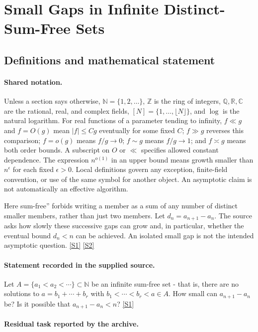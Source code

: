 \documentclass[11pt,a4paper]{article}
\newcommand{\N}{\mathbb{N}}
\newcommand{\Z}{\mathbb{Z}}
\newcommand{\Q}{\mathbb{Q}}
\newcommand{\R}{\mathbb{R}}
\newcommand{\C}{\mathbb{C}}
\newcommand{\sref}[2]{\hyperlink{source:#1:#2}{[S#2]}}
\begin{document}
\section{Small Gaps in Infinite Distinct-Sum-Free Sets}\label{statement}


\subsection{Definitions and mathematical statement}

\paragraph{Shared notation.}Unless a section says otherwise, $\N=\{1,2,\ldots\}$,
$\Z$ is the ring of integers, $\Q,\R,\C$ are the rational, real, and complex
fields, $[N]=\{1,\ldots,\lfloor N\rfloor\}$, and $\log$ is the natural
logarithm. For real functions of a parameter tending to infinity,
$f\ll g$ and $f=O(g)$ mean $|f|\leq Cg$ eventually for some fixed $C$;
$f\gg g$ reverses this comparison; $f=o(g)$ means $f/g\to0$;
$f\sim g$ means $f/g\to1$; and $f\asymp g$ means both order bounds.
A subscript on $O$ or $\ll$ specifies allowed constant dependence.
The expression $n^{o(1)}$ in an upper bound means growth smaller than
$n^\epsilon$ for each fixed $\epsilon>0$. Local definitions govern any
exception, finite-field convention, or use of the same symbol for another
object. An asymptotic claim is not automatically an effective algorithm.



Here sum-free'' forbids writing a member as a sum of any number of distinct smaller members, rather than just two members. Let $d_n=a_{n+1}-a_n$. The source asks how slowly these successive gaps can grow and, in particular, whether the eventual bound $d_n<n$ can be achieved. An isolated small gap is not the intended asymptotic question. \sref{statement}{1} \sref{statement}{2}

\paragraph{Statement recorded in the supplied source.}
Let $A=\{a_1<a_2<\cdots\}\subset \mathbb{N}$ be an infinite sum-free set - that is, there are no solutions to $ a=b_1+\cdots+b_r $ with $b_1<\cdots<b_r<a\in A$. How small can $a_{n+1}-a_n$ be? Is it possible that $a_{n+1}-a_n<n$? \sref{statement}{1}

\paragraph{Residual task reported by the archive.}
\end{document}
